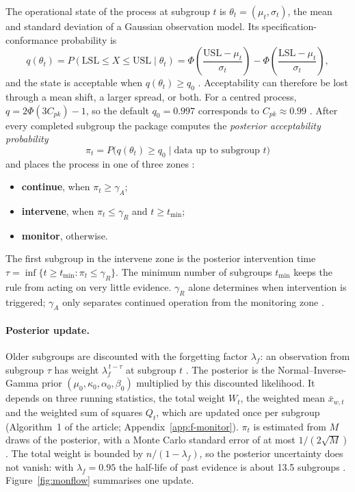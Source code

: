 \documentclass[a4paper,11pt,oneside,openany,parskip=half-,headings=standardclasses,toc=flat,numbers=noenddot]{scrbook}
\newcommand{\figref}[1]{Figure~\ref{#1}}
\begin{document}
The operational state of the process at subgroup $t$ is $\theta_t = (\mu_t, \sigma_t)$, the mean and standard
deviation of a Gaussian observation model. Its specification-conformance probability is
\begin{equation}\label{eq:conformance}
q(\theta_t) = P(\mathrm{LSL} \le X \le \mathrm{USL} \mid \theta_t)
  = \Phi\!\left(\frac{\mathrm{USL}-\mu_t}{\sigma_t}\right) - \Phi\!\left(\frac{\mathrm{LSL}-\mu_t}{\sigma_t}\right),
\end{equation}
and the state is acceptable when $q(\theta_t) \ge q_0$ \cite[Eqs.~14--18]{jy-monitor}. Acceptability can therefore be
lost through a mean shift, a larger spread, or both. For a centred process, $q = 2\Phi(3C_{pk}) - 1$, so the
default $q_0 = 0.997$ corresponds to $C_{pk} \approx 0.99$ \cite[Eqs.~16--17]{jy-monitor}. After every completed
subgroup the package computes the \emph{posterior acceptability probability}
\begin{equation}\label{eq:pi}
\pi_t = P\bigl(q(\theta_t) \ge q_0 \mid \text{data up to subgroup } t\bigr)
\end{equation}
and places the process in one of three zones \cite[Eqs.~20--21]{jy-monitor}:
\begin{itemize}
\item \textbf{continue}, when $\pi_t \ge \gamma_A$;
\item \textbf{intervene}, when $\pi_t \le \gamma_R$ and $t \ge t_{\min}$;
\item \textbf{monitor}, otherwise.
\end{itemize}
The first subgroup in the intervene zone is the posterior intervention time $\tau = \inf\{t \ge t_{\min} :
\pi_t \le \gamma_R\}$. The minimum number of subgroups $t_{\min}$ keeps the rule from acting on very little
evidence. $\gamma_R$ alone determines when intervention is triggered; $\gamma_A$ only separates continued operation
from the monitoring zone \cite[Sec.~4.3]{jy-monitor}.

\paragraph{Posterior update.} Older subgroups are discounted with the forgetting factor $\lambda_f$: an observation
from subgroup $\tau$ has weight $\lambda_f^{\,t-\tau}$ at subgroup $t$ \cite[Eq.~22]{jy-monitor}. The posterior is the
Normal--Inverse-Gamma prior $(\mu_0, \kappa_0, \alpha_0, \beta_0)$ multiplied by this discounted likelihood. It depends
on three running statistics, the total weight $W_t$, the weighted mean $\bar x_{w,t}$ and the weighted sum of squares
$Q_t$, which are updated once per subgroup (Algorithm~1 of the article; Appendix~\ref{app:f-monitor}). $\pi_t$ is
estimated from $M$ draws of the posterior, with a Monte Carlo standard error of at most $1/(2\sqrt M)$
\cite[Eqs.~25--28]{jy-monitor}. The total weight is bounded by $n/(1-\lambda_f)$, so the posterior uncertainty does
not vanish: with $\lambda_f = 0.95$ the half-life of past evidence is about 13.5 subgroups \cite[Sec.~4.4]{jy-monitor}. \figref{fig:monflow} summarises one update.
\end{document}
